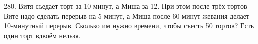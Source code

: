 280. Витя съедает торт за 10 минут, а Миша за 12. При этом после трёх тортов Вите надо сделать перерыв на 5 минут, а Миша после 60 минут жевания делает 10-минутный перерыв. Сколько им нужно времени, чтобы съесть 50 тортов? Есть один торт вдвоём нельзя.\\
